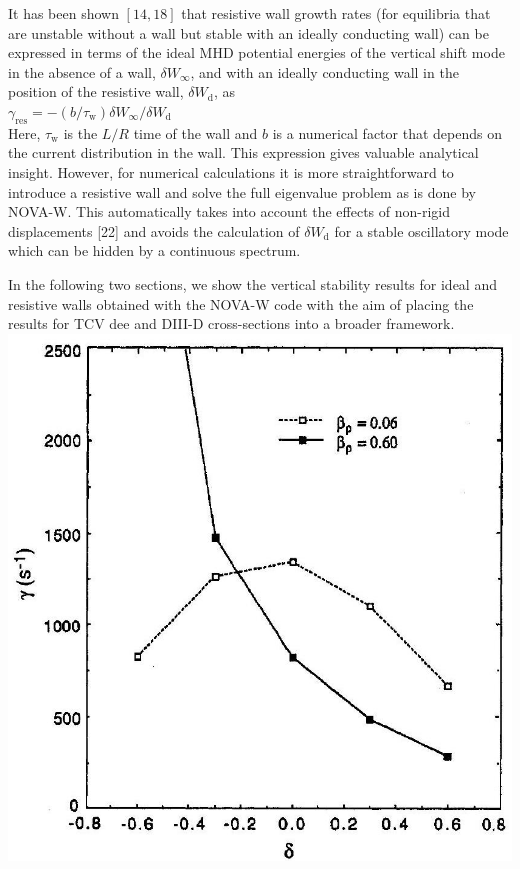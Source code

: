 \documentclass[10pt]{article}
\begin{document}
It has been shown $[14,18]$ that resistive wall growth rates (for equilibria that are unstable without a wall but stable with an ideally conducting wall) can be expressed in terms of the ideal MHD potential energies of the vertical shift mode in the absence of a wall, $\delta W_{\infty}$, and with an ideally conducting wall in the position of the resistive wall, $\delta W_{\mathrm{d}}$, as\\
$\gamma_{\mathrm{res}}=-\left(b / \tau_{\mathrm{w}}\right) \delta W_{\infty} / \delta W_{\mathrm{d}}$\\
Here, $\tau_{\mathrm{w}}$ is the $L / R$ time of the wall and $b$ is a numerical factor that depends on the current distribution in the wall. This expression gives valuable analytical insight. However, for numerical calculations it is more straightforward to introduce a resistive wall and solve the full eigenvalue problem as is done by NOVA-W. This automatically takes into account the effects of non-rigid displacements [22] and avoids the calculation of $\delta W_{\mathrm{d}}$ for a stable oscillatory mode which can be hidden by a continuous spectrum.

In the following two sections, we show the vertical stability results for ideal and resistive walls obtained with the NOVA-W code with the aim of placing the results for TCV dee and DIII-D cross-sections into a broader framework.\\
\includegraphics[max width=\textwidth, center]{2025_01_10_a0135324997886412d98g-6}
\end{document}

